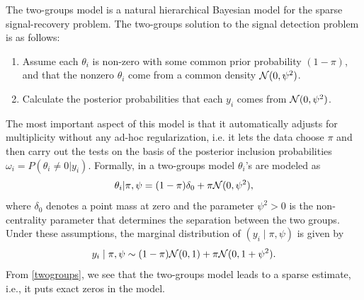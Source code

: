 \documentclass[11pt]{article}
\begin{document}
\begin{appendix}
The two-groups model is a natural hierarchical Bayesian model for the sparse
signal-recovery problem.  The two-groups solution to the signal detection
problem is as follows:
\begin{enumerate}
\item Assume each $\theta_i$ is non-zero with some common prior probability $(1 - \pi)$, and that the nonzero $\theta_i$ come from a common density ${\cal N}(0,\psi^2)$. 
\item Calculate the posterior probabilities that each $y_i$ comes from ${\cal N}(0,\psi^2)$. 
\end{enumerate}
The most important aspect of this model is that it automatically adjusts for multiplicity without any ad-hoc regularization, i.e. it lets the data choose $\pi$ and then carry out the tests on the basis of the posterior inclusion probabilities $\omega_i = P(\theta_i \neq 0 | y_i)$. Formally, in a two-groups model $\theta_i$'s are modeled as
\begin{equation}
\theta_i | \pi, \psi = (1-\pi)\delta_{0} + \pi {\cal N} (0, \psi^2), \label{spikeslab}
\end{equation}
where $\delta_{0}$ denotes a point mass at zero and the parameter $\psi^2>0$ is
the non-centrality parameter that determines the separation between the two
groups. Under these assumptions, the marginal distribution of $(y_i \mid \pi, \psi)$
is given by
\begin{equation}
y_i \mid \pi, \psi \sim  (1-\pi) {\cal N}(0, 1) + \pi {\cal N}(0, 1+\psi^2). \label{twogroups}
\end{equation}
From \eqref{twogroups}, we see that the two-groups model leads to a sparse
estimate, i.e., it puts exact zeros in the model. 
\end{appendix}



\end{document}
